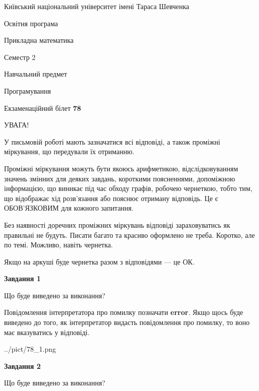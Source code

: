 \documentclass[12pt, ukrainian]{article}
\begin{document}
{{\begin {small}\par
{ \center  Київський національний університет імені Тараса Шевченка \par}
{\parbox {5 cm}{Освітня програма \hfill}{\parbox {7 cm}{Прикладна математика \hfill}}\parbox {6 cm}{\hfill Семестр 2}}\par
{\parbox {5 cm} {Навчальний предмет \hfill}\parbox {7 cm}{Програмування \hfill}\parbox {6cm}{\hfill}\par}\vspace{-7pt} \end{small}}{\center Екзаменаційний білет \No \textbf
{ 78 }\par}}
{
\begin {large}
УВАГА!

У письмовій роботі мають зазначатися всі відповіді, а також проміжні міркування, що передували їх отриманню.

Проміжні міркування можуть бути якоюсь арифметикою, відслідковуванням зна\-чень змінних для деяких завдань,
короткими поясненнями, допоміжною інформацією, що виникає під час обходу графів, робочею чернеткою,
тобто тим, що відображає хід розв’язання або пояснює отриману відповідь.
Це є ОБОВ’ЯЗКОВИМ для кожного запитання.

Без наявності доречних проміжних міркувань відповіді зараховуватись як правиль\-ні не будуть.
Писати багато та красиво оформлено не треба. Коротко, але по темі. Можли\-во, навіть чернетка.

Якщо на аркуші буде чернетка разом з відповідями --- це ОК.

\newpage

{\begin {center}\textbf{Завдання 1}\end {center}}\par
Що буде виведено за виконання?

Повідомлення інтерпретатора про помилку позначати \textbf{error}.
Якщо щось буде виведено до того, як інтерпретатор видасть повідомлення про помилку, 
то воно має вказуватись у відповіді. \par


\begin{center}
	{../pict/78_1.png}
\end{center}
\newpage

{\begin {center}\textbf{Завдання 2}\end {center}}\par
Що буде виведено за виконання?


\end{large}}
\end{document}
